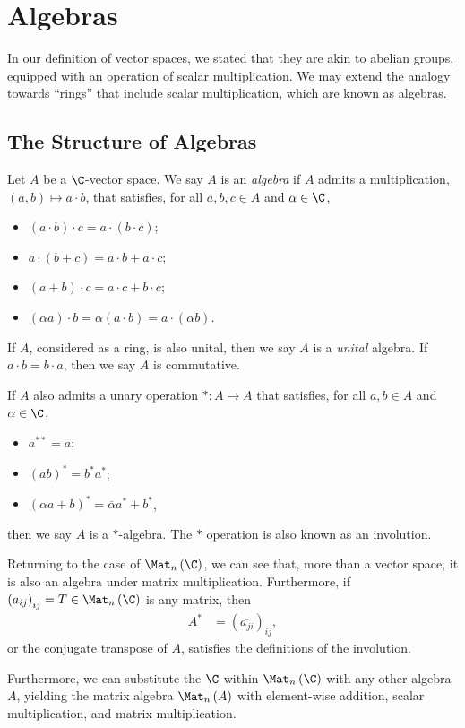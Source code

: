 \section{Algebras}%
In our definition of vector spaces, we stated that they are akin to abelian groups, equipped with an operation of scalar multiplication. We may extend the analogy towards ``rings'' that include scalar multiplication, which are known as algebras.
\subsection{The Structure of Algebras}%
\begin{definition}
  Let $A$ be a $\C$-vector space. We say $A$ is an \textit{algebra} if $A$ admits a multiplication, $\left(a,b\right)\mapsto a\cdot b$, that satisfies, for all $a,b,c\in A$ and $\alpha \in \C$,
  \begin{itemize}
    \item $\left(a\cdot b\right)\cdot c = a\cdot \left(b\cdot c\right)$;
    \item $a\cdot \left(b+c\right) = a\cdot b + a\cdot c$;
    \item $\left(a+b\right)\cdot c = a\cdot c + b\cdot c$;
    \item $\left(\alpha a\right)\cdot b = \alpha \left(a\cdot b\right) = a \cdot \left(\alpha b\right)$.
  \end{itemize}
  If $A$, considered as a ring, is also unital, then we say $A$ is a \textit{unital} algebra. If $a\cdot b = b\cdot a$, then we say $A$ is commutative.\newline

  If $A$ also admits a unary operation $\ast\colon A\rightarrow A$ that satisfies, for all $a,b\in A$ and $\alpha \in \C$,
  \begin{itemize}
    \item $a^{\ast\ast} = a$;
    \item $\left(ab\right)^{\ast} = b^{\ast}a^{\ast}$;
    \item $\left(\alpha a + b\right)^{\ast} = \overline{\alpha}a^{\ast} + b^{\ast}$,
  \end{itemize}
  then we say $A$ is a $\ast$-algebra. The $\ast$ operation is also known as an involution.
\end{definition}
\begin{example}\label{ex:matrix_algebra}
  Returning to the case of $\Mat_n\left( \C \right)$, we can see that, more than a vector space, it is also an algebra under matrix multiplication. Furthermore, if $\left( a_{ij} \right)_{ij} = T\in \Mat_n\left( \C \right)$ is any matrix, then
  \begin{align*}
    A^{\ast} &= \left( \overline{a_{ji}} \right)_{ij},
  \end{align*}
  or the conjugate transpose of $A$, satisfies the definitions of the involution.\newline

  Furthermore, we can substitute the $\C$ within $\Mat_n\left( \C \right)$ with any other algebra $A$, yielding the matrix algebra $\Mat_n\left( A \right)$ with element-wise addition, scalar multiplication, and matrix multiplication.
\end{example}
